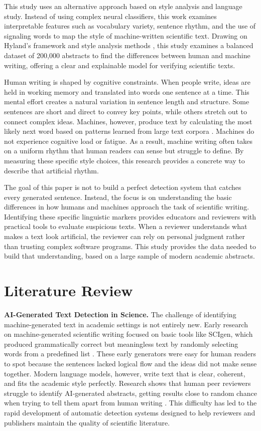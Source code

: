 \documentclass{article}
\begin{document}
This study uses an alternative approach based on style analysis and language study. Instead of using complex neural classifiers, this work examines interpretable features such as vocabulary variety, sentence rhythm, and the use of signaling words to map the style of machine-written scientific text. Drawing on Hyland's framework \cite{ref2} and style analysis methods \cite{ref1}, this study examines a balanced dataset of 200,000 abstracts to find the differences between human and machine writing, offering a clear and explainable model for verifying scientific texts.

Human writing is shaped by cognitive constraints. When people write, ideas are held in working memory and translated into words one sentence at a time. This mental effort creates a natural variation in sentence length and structure. Some sentences are short and direct to convey key points, while others stretch out to connect complex ideas. Machines, however, produce text by calculating the most likely next word based on patterns learned from large text corpora \cite{ref15}. Machines do not experience cognitive load or fatigue. As a result, machine writing often takes on a uniform rhythm that human readers can sense but struggle to define. By measuring these specific style choices, this research provides a concrete way to describe that artificial rhythm.

The goal of this paper is not to build a perfect detection system that catches every generated sentence. Instead, the focus is on understanding the basic differences in how humans and machines approach the task of scientific writing. Identifying these specific linguistic markers provides educators and reviewers with practical tools to evaluate suspicious texts. When a reviewer understands what makes a text look artificial, the reviewer can rely on personal judgment rather than trusting complex software programs. This study provides the data needed to build that understanding, based on a large sample of modern academic abstracts.

\section{Literature Review}

\textbf{AI-Generated Text Detection in Science.} The challenge of identifying machine-generated text in academic settings is not entirely new. Early research on machine-generated scientific writing focused on basic tools like SCIgen, which produced grammatically correct but meaningless text by randomly selecting words from a predefined list \cite{ref8}. These early generators were easy for human readers to spot because the sentences lacked logical flow and the ideas did not make sense together. Modern language models, however, write text that is clear, coherent, and fits the academic style perfectly. Research shows that human peer reviewers struggle to identify AI-generated abstracts, getting results close to random chance when trying to tell them apart from human writing \cite{ref4}. This difficulty has led to the rapid development of automatic detection systems designed to help reviewers and publishers maintain the quality of scientific literature.
\end{document}
